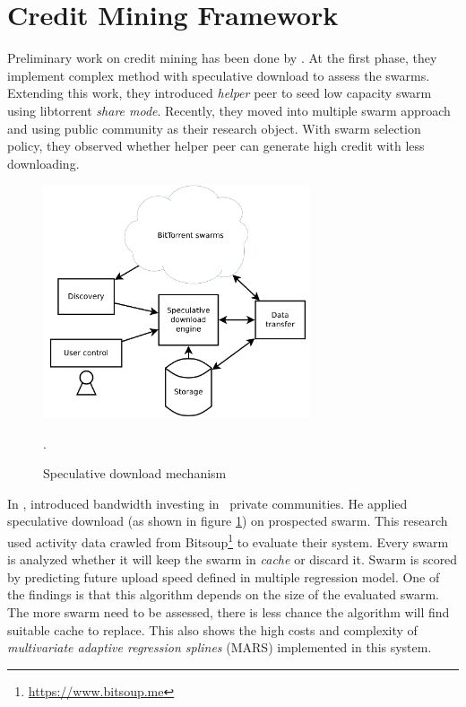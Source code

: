 

\section{Credit Mining Framework}
\label{section:cmprior}
Preliminary work on credit mining has been done by \citeauthor{2015:creditmining:capota} \cite{2015:creditmining:capota, 2013:investmentcm:capota, 2014:bwmarket:capota}. At the first phase, they implement complex method with speculative download to assess the swarms\cite{2013:investmentcm:capota}. Extending this work, they introduced \textit{helper} peer to seed low capacity swarm using libtorrent \textit{share mode}\cite{2014:bwmarket:capota}. Recently, they moved into multiple swarm approach and using public community as their research object. With swarm selection policy, they observed whether helper peer can generate high credit with less downloading\cite{2015:creditmining:capota}.

\begin{figure}[ht]
	\centering
	\includegraphics[width=0.7\textwidth]{pics/SDE2013.png}
	\caption{Speculative download mechanism \cite{2013:investmentcm:capota}}.
	\label{fig:sde13}
\end{figure}

In \citeyear{2013:investmentcm:capota}, \citeauthor{2013:investmentcm:capota} introduced bandwidth investing in \bt~private communities. He applied speculative download (as shown in figure \ref{fig:sde13}) on prospected swarm. This research used activity data crawled from Bitsoup\footnote{\url{https://www.bitsoup.me}} to evaluate their system. Every swarm is analyzed whether it will keep the swarm in \textit{cache} or discard it. Swarm is scored by predicting future upload speed defined in multiple regression model\cite{2013:investmentcm:capota}. One of the findings is that this algorithm depends on the size of the evaluated swarm. The more swarm need to be assessed, there is less chance the algorithm will find suitable cache to replace. This also shows the high costs and complexity of \textit{multivariate adaptive regression splines} (MARS) implemented in this system.

